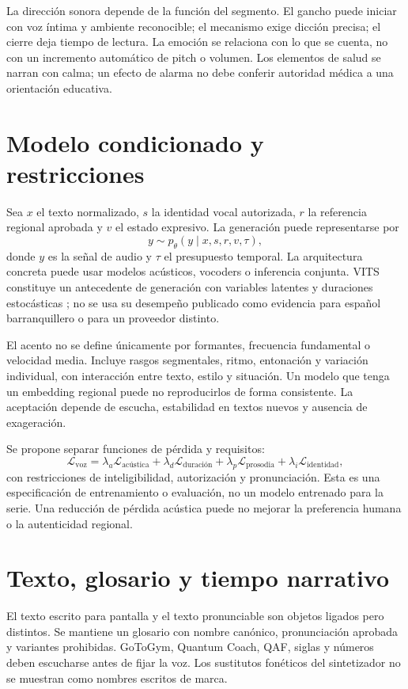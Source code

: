 La dirección sonora depende de la función del segmento. El gancho puede iniciar con voz íntima y ambiente reconocible; el mecanismo exige dicción precisa; el cierre deja tiempo de lectura. La emoción se relaciona con lo que se cuenta, no con un incremento automático de pitch o volumen. Los elementos de salud se narran con calma; un efecto de alarma no debe conferir autoridad médica a una orientación educativa.

\section{Modelo condicionado y restricciones}
Sea $x$ el texto normalizado, $s$ la identidad vocal autorizada, $r$ la referencia regional aprobada y $v$ el estado expresivo. La generación puede representarse por
\begin{equation}
 y\sim p_\theta(y\mid x,s,r,v,\tau),
\end{equation}
donde $y$ es la señal de audio y $\tau$ el presupuesto temporal. La arquitectura concreta puede usar modelos acústicos, vocoders o inferencia conjunta. VITS constituye un antecedente de generación con variables latentes y duraciones estocásticas \cite{vits}; no se usa su desempeño publicado como evidencia para español barranquillero o para un proveedor distinto.

El acento no se define únicamente por formantes, frecuencia fundamental o velocidad media. Incluye rasgos segmentales, ritmo, entonación y variación individual, con interacción entre texto, estilo y situación. Un modelo que tenga un embedding regional puede no reproducirlos de forma consistente. La aceptación depende de escucha, estabilidad en textos nuevos y ausencia de exageración.

Se propone separar funciones de pérdida y requisitos:
\begin{equation}
 \mathcal L_{\mathrm{voz}}=\lambda_a\mathcal L_{\mathrm{acústica}}+
 \lambda_d\mathcal L_{\mathrm{duración}}+\lambda_p\mathcal L_{\mathrm{prosodia}}+
 \lambda_i\mathcal L_{\mathrm{identidad}},
\end{equation}
con restricciones de inteligibilidad, autorización y pronunciación. Esta es una especificación de entrenamiento o evaluación, no un modelo entrenado para la serie. Una reducción de pérdida acústica puede no mejorar la preferencia humana o la autenticidad regional.

\section{Texto, glosario y tiempo narrativo}
El texto escrito para pantalla y el texto pronunciable son objetos ligados pero distintos. Se mantiene un glosario con nombre canónico, pronunciación aprobada y variantes prohibidas. GoToGym, Quantum Coach, QAF, siglas y números deben escucharse antes de fijar la voz. Los sustitutos fonéticos del sintetizador no se muestran como nombres escritos de marca.


